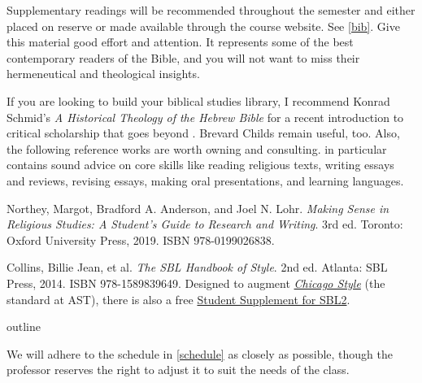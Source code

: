 \documentclass[titlepage]{article}
\begin{document}
Supplementary readings will be recommended throughout the semester and
either placed on reserve or made available through the course website.
See \autoref{bib}. Give this material good effort and attention. It
represents some of the best contemporary readers of the Bible, and you
will not want to miss their hermeneutical and theological insights.

If you are looking to build your biblical studies library, I recommend
Konrad Schmid's \emph{A Historical Theology of the Hebrew Bible}
\cite{ks19} for a recent introduction to critical scholarship that goes
beyond \cite{hbfb}. Brevard Childs \cite{bc79, bc92} remain useful, too.
Also, the following reference works are worth owning and consulting.
\cite{rlgs} in particular contains sound advice on core skills like
reading religious texts, writing essays and reviews, revising essays,
making oral presentations, and learning languages.

\begingroup
\renewcommand{\section}[2]{}%
\begin{thebibliography}{Making Sense}%

	 Northey, Margot, Bradford A. Anderson, and Joel N. Lohr.
	\emph{Making Sense in Religious Studies: A Student's Guide to Research and Writing}.
	3rd ed. Toronto: Oxford University Press, 2019. ISBN 978-0199026838.

	 Collins, Billie Jean, et al.
	\emph{The SBL Handbook of Style}.
	2nd ed. Atlanta: SBL Press, 2014. ISBN 978-1589839649.
	Designed to augment \href{http://www.chicagomanualofstyle.org/home.html}{\emph{Chicago Style}}
	(the standard at AST), there is also a free
	\href{https://www.sbl-site.org/assets/pdfs/pubs/SBLHSsupp2015-02.pdf}{Student Supplement for SBL2}.

\end{thebibliography}
\endgroup


\section{Course Outline}
\label{outline}

We will adhere to the schedule in \autoref{schedule} as closely as
possible, though the professor reserves the right to adjust it to suit
the needs of the class.
\end{document}
